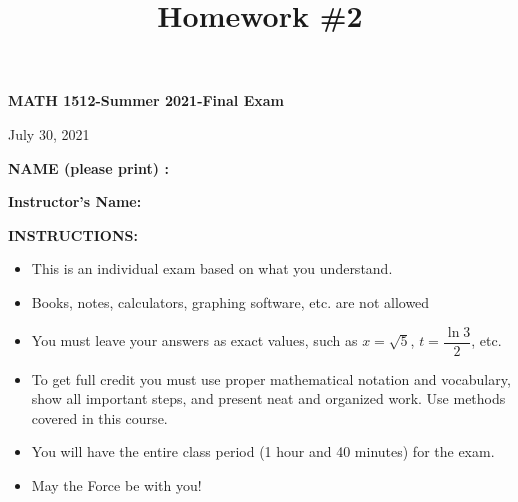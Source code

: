\documentclass[11pt,reqno]{article}
\title{Homework \#2}
\theoremstyle{definition}
\begin{document}

\centerline{\textbf{\Large{MATH 1512-Summer 2021-Final Exam}}}


\vspace{0.2 in}
\centerline{ \Large{July 30, 2021}}
\vspace{0.3 in}

\textbf{NAME (please print) :} \hrulefill
\vspace{0.2 in}
\begin{multicols}{2}
	\textbf{Instructor's Name:} \hrulefill \\
	\vspace{0.2 in}
	
	\vspace{0.2 in}
\end{multicols}
\vspace{0.2 in}

\textbf{INSTRUCTIONS:}
\begin{itemize}
	
	
	\item This is an individual exam based on what you understand.
	\item Books, notes, calculators, graphing software, etc. are not allowed
	\item You must leave your answers as exact values, such as $x=\sqrt{5}$, $t=\dfrac{\ln 3}{2}$, etc.
	\item To get full credit you must use proper mathematical notation and vocabulary, show all important steps, and present neat and organized work.  Use methods covered in this course.
	\item You will have the entire class period (1 hour and 40 minutes) for the exam.
	\item May the Force be with you!
	
	
\end{itemize}
\vspace{0.08 in}


\newpage
	
\end{document}
